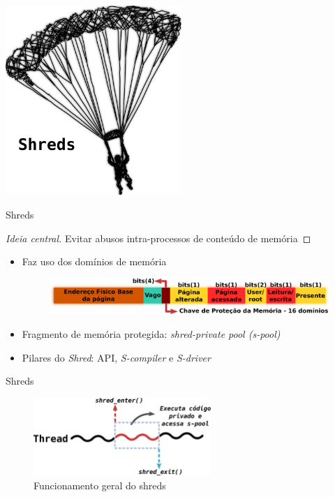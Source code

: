 \documentclass[xcolor={usenames,svgnames,dvipsnames},brazil,english,12pt,aspectratio=149]{beamer}
\begin{document}
\begin{frame}[plain]
  \includegraphics[width=0.5\textwidth]{presentation_cap2_one}
\end{frame}

\begin{frame}{Shreds}

  \begin{proof}[Ideia central]
Evitar abusos intra-processos de conteúdo de memória
  \end{proof}

  \begin{itemize}
    \item Faz uso dos domínios de memória
      \begin{figure}[!h]
        \centering
        \includegraphics[width=.8\textwidth]{pte_domain} 
      \end{figure}

    \item Fragmento de memória protegida: \emph{shred-private pool (s-pool)}
    \item Pilares do \emph{Shred}: API, \emph{S-compiler} e \emph{S-driver}
  \end{itemize}
\end{frame}

\begin{frame}{Shreds}
  \begin{figure}[!h]
    \centering
    \includegraphics[width=0.6\textwidth]{shreds} 
    \caption*{Funcionamento geral do shreds}
  \end{figure}
\end{frame}
\end{document}
